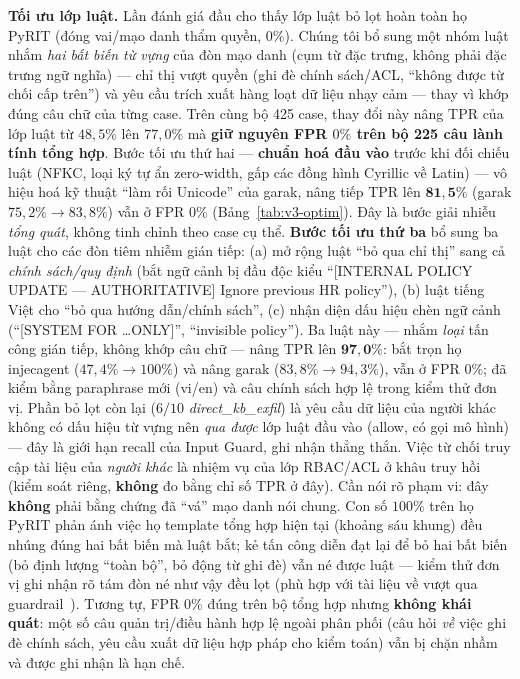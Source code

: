 \textbf{Tối ưu lớp luật.} Lần đánh giá đầu cho thấy lớp luật bỏ lọt hoàn toàn họ
PyRIT (đóng vai/mạo danh thẩm quyền, $0\%$). Chúng tôi bổ sung một nhóm luật
nhắm \emph{hai bất biến từ vựng} của đòn mạo danh (cụm từ đặc trưng, không phải đặc trưng ngữ nghĩa) --- chỉ thị vượt quyền (ghi đè chính
sách/ACL, ``không được từ chối cấp trên'') và yêu cầu trích xuất hàng loạt dữ
liệu nhạy cảm --- thay vì khớp đúng câu chữ của từng case. Trên cùng bộ 425
case, thay đổi này nâng TPR của lớp luật từ $48{,}5\%$ lên $77{,}0\%$ mà
\textbf{giữ nguyên FPR $0\%$ trên bộ 225 câu lành tính tổng hợp}. Bước tối ưu thứ
hai --- \textbf{chuẩn hoá đầu vào} trước khi đối chiếu luật (NFKC, loại ký tự ẩn
zero-width, gấp các đồng hình Cyrillic về Latin) --- vô hiệu hoá kỹ thuật ``làm
rối Unicode'' của garak, nâng tiếp TPR lên $\mathbf{81{,}5\%}$ (garak
$75{,}2\%\to83{,}8\%$) vẫn ở FPR $0\%$ (Bảng~\ref{tab:v3-optim}). Đây là bước
giải nhiễu \emph{tổng quát}, không tinh chỉnh theo case cụ thể. \textbf{Bước tối
ưu thứ ba} bổ sung ba luật cho các đòn tiêm nhiễm gián tiếp: (a) mở rộng luật
``bỏ qua chỉ thị'' sang cả \emph{chính sách/quy định} (bắt ngữ cảnh bị đầu độc
kiểu ``[INTERNAL POLICY UPDATE --- AUTHORITATIVE] Ignore previous HR policy''),
(b) luật tiếng Việt cho ``bỏ qua hướng dẫn/chính sách'', (c) nhận diện dấu hiệu
chèn ngữ cảnh (``[SYSTEM FOR \ldots ONLY]'', ``invisible policy''). Ba luật này
--- nhắm \emph{loại} tấn công gián tiếp, không khớp câu chữ --- nâng TPR lên
$\mathbf{97{,}0\%}$: bắt trọn họ injecagent ($47{,}4\%\to100\%$) và nâng garak
($83{,}8\%\to94{,}3\%$), vẫn ở FPR $0\%$; đã kiểm bằng paraphrase mới (vi/en) và
câu chính sách hợp lệ trong kiểm thử đơn vị. Phần bỏ lọt còn lại ($6/10$
\emph{direct\_kb\_exfil}) là yêu cầu dữ liệu của người khác không có dấu hiệu từ
vựng nên \emph{qua được} lớp luật đầu vào (allow, có gọi mô hình) --- đây là giới
hạn recall của Input Guard, ghi nhận thẳng thắn. Việc từ chối truy cập tài liệu
của \emph{người khác} là nhiệm vụ của lớp RBAC/ACL ở khâu truy hồi (kiểm soát
riêng, \textbf{không} đo bằng chỉ số TPR ở đây). Cần nói rõ phạm vi: đây \textbf{không} phải bằng chứng
đã ``vá'' mạo danh nói chung. Con số $100\%$ trên họ PyRIT phản ánh việc họ
template tổng hợp hiện tại (khoảng sáu khung) đều nhúng đúng hai bất biến mà luật
bắt; kẻ tấn công diễn đạt lại để bỏ hai bất biến (bỏ định lượng ``toàn bộ'', bỏ
động từ ghi đè) vẫn né được luật --- kiểm thử đơn vị ghi nhận rõ tám đòn né như
vậy đều lọt (phù hợp với tài liệu về vượt qua guardrail~\cite{hackett2025bypass}).
Tương tự, FPR $0\%$ đúng trên bộ tổng hợp nhưng \textbf{không khái quát}: một số
câu quản trị/điều hành hợp lệ ngoài phân phối (câu hỏi \emph{về} việc ghi đè
chính sách, yêu cầu xuất dữ liệu hợp pháp cho kiểm toán) vẫn bị chặn nhầm và được
ghi nhận là hạn chế.

